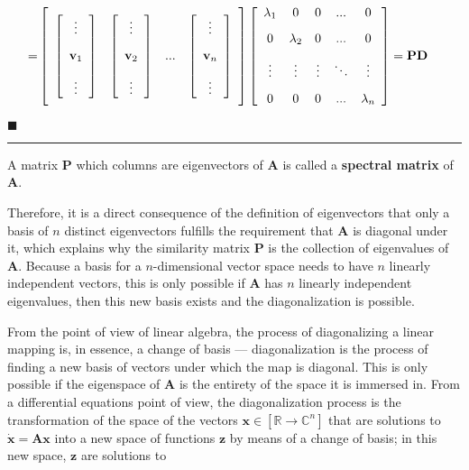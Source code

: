 \begin{align}
%
	= & \left[\raisebox{15mm}{} \begin{array}{cccc} \left[\begin{array}{c} \vdots \\[3mm] \mathbf{v}_1 \\[3mm] \vdots \end{array}\right] & \left[\begin{array}{c} \vdots \\[3mm] \mathbf{v}_2 \\[3mm] \vdots \end{array}\right] & ... & \left[\begin{array}{c} \vdots \\[3mm] \mathbf{v}_n \\[3mm] \vdots \end{array}\right] \end{array}\right]\left[\begin{array}{ccccc}\lambda_1 & 0 & 0 & ... & 0 \\[3mm] 0 & \lambda_2 & 0 & ... & 0 \\[3mm] \vdots & \vdots & \vdots & \ddots & \vdots \\[3mm] 0 & 0 & 0 & ... & \lambda_n \end{array}\right] = \mathbf{PD}
\end{align}

\hfill$\blacksquare$
\vspace{5mm}
\hrule
\vspace{5mm} %
\begin{remark}\label{remark:spectral_matrix} A matrix $\mathbf{P}$ which columns are eigenvectors of $\mathbf{A}$ is called a \textbf{spectral matrix} of $\mathbf{A}$. \end{remark}

	Therefore, it is a direct consequence of the definition of eigenvectors that only a basis of $n$ distinct eigenvectors fulfills the requirement that $\mathbf{A}$ is diagonal under it, which explains why the similarity matrix $\mathbf{P}$ is the collection of eigenvalues of $\mathbf{A}$. Because a basis for a $n$-dimensional vector space needs to have $n$ linearly independent vectors, this is only possible if $\mathbf{A}$ has $n$ linearly independent eigenvalues, then this new basis exists and the diagonalization is possible.

	From the point of view of linear algebra, the process of diagonalizing a linear mapping is, in essence, a change of basis — diagonalization is the process of finding a new basis of vectors under which the map is diagonal. This is only possible if the eigenspace of $\mathbf{A}$ is the entirety of the space it is immersed in. From a differential equations point of view, the diagonalization process is the transformation of the space of the vectors $\mathbf{x}\in\left[\mathbb{R}\to \mathbb{C}^n\right]$ that are solutions to $\dot{\mathbf{x}} = \mathbf{Ax}$ into a new space of functions $\mathbf{z}$ by means of a change of basis; in this new space, $\mathbf{z}$ are solutions to

